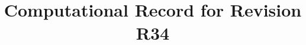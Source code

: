 
\begin{frontmatter}
\title{Computational Record for Revision R34}
\begin{aug}\author[id=au1,addressref={add1}]{~}\address[id=add1]{}\end{aug}
\end{frontmatter}


